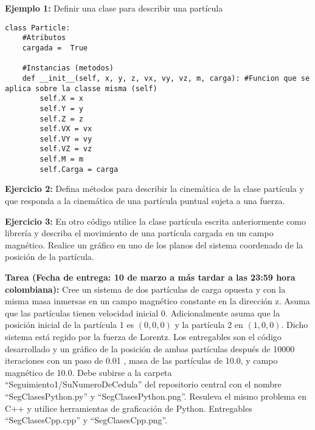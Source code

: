 \documentclass[10.5pt]{article}
\begin{document}
{\bf Ejemplo 1:} Definir una clase para describir una partícula
\begin{verbatim}
class Particle:
    #Atributos
    cargada =  True
    
    #Instancias (metodos)
    def __init__(self, x, y, z, vx, vy, vz, m, carga): #Funcion que se aplica sobre la classe misma (self)
        self.X = x
        self.Y = y
        self.Z = z
        self.VX = vx
        self.VY = vy
        self.VZ = vz
        self.M = m
        self.Carga = carga
\end{verbatim}

{\bf Ejercicio 2:} Defina métodos para describir la cinemática de la clase partícula y que responda a la cinemática de una partícula puntual sujeta a una fuerza.

{\bf Ejercicio 3:} En otro código utilice la clase partícula escrita anteriormente como librería y describa el movimiento de una partícula cargada en un campo magnético. Realice un gráfico en uno de los planos del sistema coordenado de la posición de la partícula.

{\bf Tarea (Fecha de entrega: 10 de marzo a más tardar a las 23:59 hora colombiana):}  Cree un sistema de dos partículas de carga opuesta y con la misma masa inmersas en un campo magnético constante en la dirección z. Asuma que las partículas tienen velocidad inicial 0. Adicionalmente asuma que la posición inicial de la partícula 1 es $(0,0,0)$ y la partícula 2 en $(1,0,0)$. Dicho sistema está regido por la fuerza de Lorentz. Los entregables son el código desarrollado y un gráfico de la posición de ambas partículas después de 10000 iteraciones con un paso de 0.01 , masa de las partículas de 10.0, y campo magnético de 10.0. Debe subirse a la carpeta ``Seguimiento1/SuNumeroDeCedula'' del repositorio central con el nombre ``SegClasesPython.py'' y ``SegClasesPython.png''. Resuleva el mismo problema en C++ y utilice herramientas de graficación de Python. Entregables ``SegClasesCpp.cpp'' y ``SegClasesCpp.png''.





%
\end{document}

